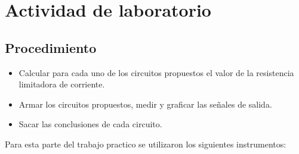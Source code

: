 \documentclass[chaptersright]{informeutn}
\begin{document}
  
  \section{Actividad de laboratorio}

\subsection*{Procedimiento}

\begin{itemize}
    \item Calcular para cada uno de los circuitos propuestos el valor de la resistencia limitadora de corriente.
    \item Armar los circuitos propuestos, medir y graficar las señales de salida.
    \item Sacar las conclusiones de cada circuito.
\end{itemize}
    
    Para esta parte del trabajo practico se utilizaron los siguientes instrumentos:
\end{document}

